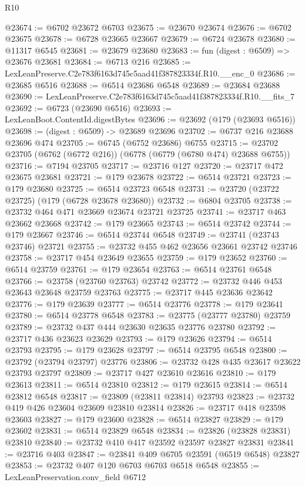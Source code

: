 \begin{lexlean}{R10}
\begin{coremodule}
@23674 := @6702 @23672 @6703
@23675 := @23670 @23674
@23676 := @6702 @23675
@23678 := @6728 @23665 @23667
@23679 := @6724 @23678
@23680 := @11317 @6545
@23681 := @23679 @23680
@23683 := fun (digest : @6509) => @23676 @23681
@23684 := @6713 @216
@23685 := LexLeanPreserve.C2e783f6163d745c5aad41f387823334f.R10.__enc_0
@23686 := @23685 @6516
@23688 := @6514 @23686 @6548
@23689 := @23684 @23688
@23690 := LexLeanPreserve.C2e783f6163d745c5aad41f387823334f.R10.__fits_7
@23692 := @6723 (@23690 @6516)
@23693 := LexLeanBoot.ContentId.digestBytes
@23696 := @23692 (@179 (@23693 @6516))
@23698 := (digest : @6509) -> @23689 @23696
@23702 := @6737 @216 @23688 @23696 @474
@23705 := @6745 (@6752 @23686) @6755
@23715 := @23702 @23705 (@6762 (@6772 @216)) (@6778 (@6779 (@6780 @474) @23688 @6755))
@23716 := @7194 @23705
@23717 := @23716 @127
@23720 := @23717 @472 @23675 @23681
@23721 := @179 @23678
@23722 := @6514 @23721
@23723 := @179 @23680
@23725 := @6514 @23723 @6548
@23731 := @23720 (@23722 @23725) (@179 (@6728 @23678 @23680))
@23732 := @6804 @23705
@23738 := @23732 @464 @471 @23669 @23674 @23721 @23725
@23741 := @23717 @463 @23662 @23668
@23742 := @179 @23665
@23743 := @6514 @23742
@23744 := @179 @23667
@23746 := @6514 @23744 @6548
@23749 := @23741 (@23743 @23746) @23721
@23755 := @23732 @455 @462 @23656 @23661 @23742 @23746
@23758 := @23717 @454 @23649 @23655
@23759 := @179 @23652
@23760 := @6514 @23759
@23761 := @179 @23654
@23763 := @6514 @23761 @6548
@23766 := @23758 (@23760 @23763) @23742
@23772 := @23732 @446 @453 @23643 @23648 @23759 @23763
@23775 := @23717 @445 @23636 @23642
@23776 := @179 @23639
@23777 := @6514 @23776
@23778 := @179 @23641
@23780 := @6514 @23778 @6548
@23783 := @23775 (@23777 @23780) @23759
@23789 := @23732 @437 @444 @23630 @23635 @23776 @23780
@23792 := @23717 @436 @23623 @23629
@23793 := @179 @23626
@23794 := @6514 @23793
@23795 := @179 @23628
@23797 := @6514 @23795 @6548
@23800 := @23792 (@23794 @23797) @23776
@23806 := @23732 @428 @435 @23617 @23622 @23793 @23797
@23809 := @23717 @427 @23610 @23616
@23810 := @179 @23613
@23811 := @6514 @23810
@23812 := @179 @23615
@23814 := @6514 @23812 @6548
@23817 := @23809 (@23811 @23814) @23793
@23823 := @23732 @419 @426 @23604 @23609 @23810 @23814
@23826 := @23717 @418 @23598 @23603
@23827 := @179 @23600
@23828 := @6514 @23827
@23829 := @179 @23602
@23831 := @6514 @23829 @6548
@23834 := @23826 (@23828 @23831) @23810
@23840 := @23732 @410 @417 @23592 @23597 @23827 @23831
@23841 := @23716 @403
@23847 := @23841 @409 @6705 @23591 (@6519 @6548) @23827
@23853 := @23732 @407 @120 @6703 @6703 @6518 @6548
@23855 := LexLeanPreservation.conv_field @6712

\end{coremodule}
\end{lexlean}
